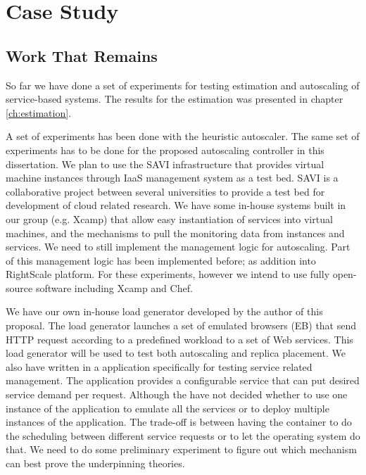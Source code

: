 \chapter{Case Study} 
\label{ch:experiments}

\section{Work That Remains}   
 
  So far we have done a set of experiments for  testing  estimation and autoscaling of service-based systems.  The results for the estimation was presented in chapter \ref{ch:estimation}. 
   
  A set of experiments has been done with the heuristic autoscaler.  The same set of experiments has to be done for the proposed autoscaling controller in this dissertation.  We plan to use the SAVI infrastructure that provides virtual machine instances through IaaS management system as a test bed.  SAVI is a collaborative project between several universities to provide a test bed for development of cloud related research.
   We have some in-house systems built in our group  (e.g. Xcamp) that allow easy instantiation of services into virtual machines, and the mechanisms to pull the monitoring data from instances and services.  We need to still   implement the management logic for autoscaling.   Part of this management logic has been implemented before; as addition into RightScale platform.  For these experiments, however we intend to use fully open-source software including Xcamp and Chef. 
   
 We have our own in-house load generator developed by the author of this proposal.  The load generator launches a set of emulated browsers (EB) that send HTTP request according to a predefined workload to a set of Web services. This load generator will be used to test both autoscaling and replica placement.  We also have written in a application specifically for testing service related management.  The application provides a configurable service that can put desired service demand per request.  Although the have not decided whether to use one instance of the application to emulate all the services or to deploy multiple instances of the application.  The trade-off is between having the container to do the scheduling between different service requests or to let the operating system do that. We need to do some preliminary experiment to figure out which mechanism can best prove the underpinning theories. 
  
